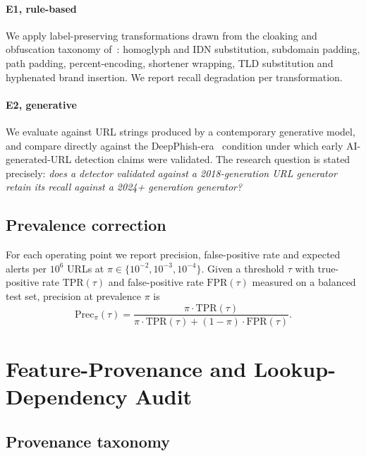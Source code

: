 \documentclass[conference]{IEEEtran}
\begin{document}
\paragraph{E1, rule-based} We apply label-preserving transformations drawn from
the cloaking and obfuscation taxonomy of~\cite{li2023cloak}: homoglyph and IDN
substitution, subdomain padding, path padding, percent-encoding, shortener
wrapping, TLD substitution and hyphenated brand insertion. We report recall
degradation per transformation.

\paragraph{E2, generative} We evaluate against URL strings produced by a
contemporary generative model, and compare directly against the
DeepPhish-era~\cite{bahnsen2018deepphish} condition under which early
AI-generated-URL detection claims were validated. The research question is
stated precisely: \emph{does a detector validated against a 2018-generation URL
generator retain its recall against a 2024+ generation generator?}

\subsection{Prevalence correction}

For each operating point we report precision, false-positive rate and expected
alerts per $10^6$ URLs at $\pi \in \{10^{-2}, 10^{-3}, 10^{-4}\}$. Given a
threshold $\tau$ with true-positive rate $\mathrm{TPR}(\tau)$ and false-positive
rate $\mathrm{FPR}(\tau)$ measured on a balanced test set, precision at
prevalence $\pi$ is
\begin{equation}
\mathrm{Prec}_\pi(\tau) =
\frac{\pi \cdot \mathrm{TPR}(\tau)}
     {\pi \cdot \mathrm{TPR}(\tau) + (1-\pi) \cdot \mathrm{FPR}(\tau)} .
\label{eq:prec}
\end{equation}

\section{Feature-Provenance and Lookup-Dependency Audit}
\label{sec:prov}

\subsection{Provenance taxonomy}
\label{sec:prov-classes}
\end{document}
